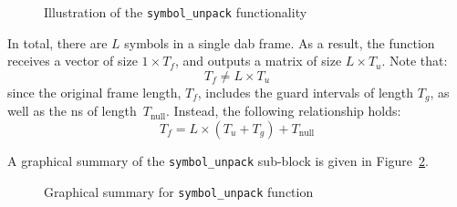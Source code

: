 \documentclass[class=report,11pt,crop=false]{standalone}
\begin{document}
\begin{figure}[htbp]
  \centering
  \captionsetup{type=figure}
  \def\svgwidth{\linewidth}
  { %
    \scriptsize
      }
  \caption{Illustration of the \texttt{symbol\_unpack} functionality}
  \label{fig:symbols_unpack_illustration}
\end{figure}

In total, there are \(L\) symbols in a single \gls{dab} frame. As a result, the function receives a vector of size \(1\times T_f\), and outputs a matrix of size \(L\times T_u\). Note that:
\begin{equation}
  T_f \ne L\times T_u
\end{equation}
since the original frame length, \(T_f\), includes the guard intervals of length \(T_g\), as well as the \gls{ns} of length~\(T_\mathrm{null}\). Instead, the following relationship holds:
\begin{equation}
  T_f = L\times (T_u + T_g) + T_\mathrm{null}
\end{equation}

A graphical summary of the \texttt{symbol\_unpack} sub-block is given in Figure~\ref{fig:symbols_unpack}.

\begin{figure}[htbp]
  \centering
  \captionsetup{type=figure}
  \def\svgwidth{\linewidth}
  { %
      }
  \caption{Graphical summary for \texttt{symbol\_unpack} function}
  \label{fig:symbols_unpack}
\end{figure}




\end{document}
